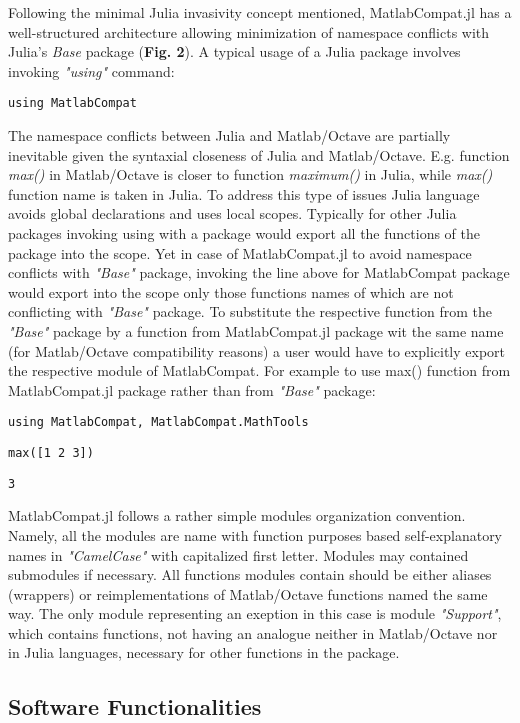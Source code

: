 Following the minimal Julia invasivity concept mentioned, MatlabCompat.jl has a well-structured architecture allowing minimization of namespace conflicts with Julia's \textit{Base} package (\textbf{Fig. 2}). A typical usage of a Julia package involves invoking \textit{"using"} command:

\verb|using MatlabCompat|

The namespace conflicts between Julia and Matlab/Octave are partially inevitable given the syntaxial closeness of Julia and Matlab/Octave. E.g. function \textit{max()} in Matlab/Octave is closer to function \textit{maximum()} in Julia, while \textit{max()} function name is taken in Julia. To address this type of issues Julia language avoids global declarations and uses local scopes. Typically for other Julia packages invoking using with a package would export all the functions of the package into the scope. Yet in case of MatlabCompat.jl to avoid namespace conflicts with \textit{"Base"} package, invoking the line above for MatlabCompat package would export into the scope only those functions names of which are not conflicting with \textit{"Base"} package. To substitute the respective function from the \textit{"Base"} package by a function from MatlabCompat.jl package wit the same name (for Matlab/Octave compatibility reasons) a user would have to explicitly export the respective module of MatlabCompat. For example to use max() function from MatlabCompat.jl package rather than from \textit{"Base"} package:

\verb|using MatlabCompat, MatlabCompat.MathTools|

\verb|max([1 2 3])|

\verb|3|


MatlabCompat.jl follows a rather simple modules organization convention. Namely, all the modules are name with function purposes based self-explanatory names in \textit{"CamelCase"} with capitalized first letter. Modules may contained submodules if necessary. All functions modules contain should be either aliases (wrappers) or reimplementations of Matlab/Octave functions named the same way. The only module representing an exeption in this case is module \textit{"Support"}, which contains functions, not having an analogue neither in Matlab/Octave nor in Julia languages, necessary for other functions in the package.

\subsection{Software Functionalities}
\label{} 

